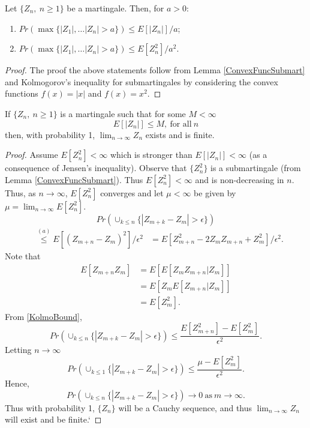 \documentclass[a4paper,10pt,english]{article}
\begin{document}
\begin{cor}
\label{MartingaleBoundCor}
Let $\{Z_n,~n \geq 1\}$ be a martingale. Then, for $a>0$:
\begin{enumerate}
\item $Pr(\max\{|Z_1|, \hdots |Z_n|>a\}) \leq E[|Z_n|]/a$;
\item $Pr(\max\{|Z_1|, \hdots |Z_n|>a\}) \leq E[Z_n^2]/a^2$.
\end{enumerate} 
\end{cor}
\begin{proof}
The proof the above statements follow from Lemma \ref{ConvexFuncSubmart} and Kolmogorov's inequality for submartingales by considering the convex functions $f(x)=|x|$ and $f(x)=x^2$. 
\end{proof}
\begin{thm}
\label{MartingaleConvergenceTheorem}
If $\{Z_n,~n \geq 1\}$ is a martingale such that for some $M< \infty$
\begin{equation*}
E[|Z_n|] \leq M, ~ \text{for all}~ n
\end{equation*}
then, with probability 1, $\lim_{n \rightarrow \infty}Z_n$ exists and is finite.
\end{thm}
\begin{proof}
Assume $E[Z_n^2]< \infty$ which is stronger than $E[|Z_n|]< \infty$ (as a consequence of Jensen's inequality). Observe that $\{Z_n^2\}$ is a submartingale (from Lemma \ref{ConvexFuncSubmart}). Thus $E[Z_n^2]<\infty$ and is non-decreasing in $n$. Thus, as $n \rightarrow \infty$, $E[Z_n^2]$ converges and let $\mu<\infty$ be given by $\mu=\lim_{n \rightarrow \infty}E[Z_n^2]$.
\begin{equation}
\label{KolmoBound}
Pr(\cup_{k \leq n} \{|Z_{m+k}-Z_m|> \epsilon\} )
\end{equation}  
\begin{eqnarray*}
&\stackrel{(a)}{\leq }E[(Z_{m+n}-Z_m)^2]/\epsilon^2
&=E[Z_{m+n}^2-2Z_mZ_{m+n}+Z_m^2]/\epsilon^2.
\end{eqnarray*}
Note that 
\begin{eqnarray*}
E[Z_{m+n}Z_m]&=E[E[Z_mZ_{m+n}|Z_m]]\\
&=E[Z_mE[Z_{m+n}|Z_m]]\\
&=E[Z_m^2].
\end{eqnarray*}
From \ref{KolmoBound}, 
\begin{equation*}
Pr(\cup_{k \leq n} \{|Z_{m+k}-Z_m|> \epsilon\}) \leq \frac{E[Z_{m+n}^2]-E[Z_m^2]}{\epsilon^2}.
\end{equation*}
Letting $n \rightarrow \infty$
\begin{equation*}
Pr(\cup_{k \leq 1} \{|Z_{m+k}-Z_m|> \epsilon\}) \leq \frac{\mu-E[Z_m^2]}{\epsilon^2}.
\end{equation*}
Hence,
\begin{equation*}
Pr(\cup_{k \leq n} \{|Z_{m+k}-Z_m|> \epsilon\}) \rightarrow 0 ~\text{as}~ m \rightarrow \infty.
\end{equation*}
Thus with probability 1, $\{Z_n\}$ will be  a Cauchy sequence, and thus $\lim_{n \rightarrow \infty}Z_n$ will exist and be finite.`
\end{proof}
\end{document}
